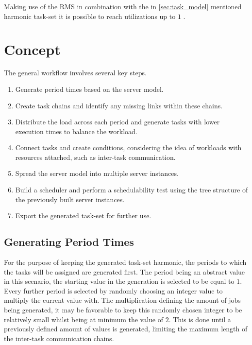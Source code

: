 Making use of the \ac{RMS} in combination with the in \cref{sec:task_model} mentioned harmonic task-set it is possible to reach utilizations up to $1$ \cite{liuSchedulingAlgorithmsMultiprogramming1973}.


\cite{dar-tzenpengAssignmentSchedulingCommunicating1997}


\section{Concept}\label{sec:concept}
The general workflow involves several key steps. 
\begin{enumerate}
	\item Generate period times based on the server model. 
	\item Create task chains and identify any missing links within these chains. 
	\item Distribute the load across each period and generate tasks with lower execution times to balance the workload.
	\item Connect tasks and create conditions, considering the idea of workloads with resources attached, such as inter-task communication. 
	\item Spread the server model into multiple server instances. 
	\item Build a scheduler and perform a schedulability test using the tree structure of the previously built server instances.
	\item Export the generated task-set for further use.
\end{enumerate}

\subsection{Generating Period Times}\label{sec:generating_period_times}
For the purpose of keeping the generated task-set harmonic, the periods to which the tasks will be assigned are generated first.
The period being an abstract value in this scenario, the starting value in the generation is selected to be equal to $1$.
Every further period is selected by randomly choosing an integer value to multiply the current value with.
The multiplication defining the amount of jobs being generated, it may be favorable to keep this randomly chosen integer to be relatively small whilst being at minimum the value of $2$. 
This is done until a previously defined amount of values is generated, limiting the maximum length of the inter-task communication chains.

